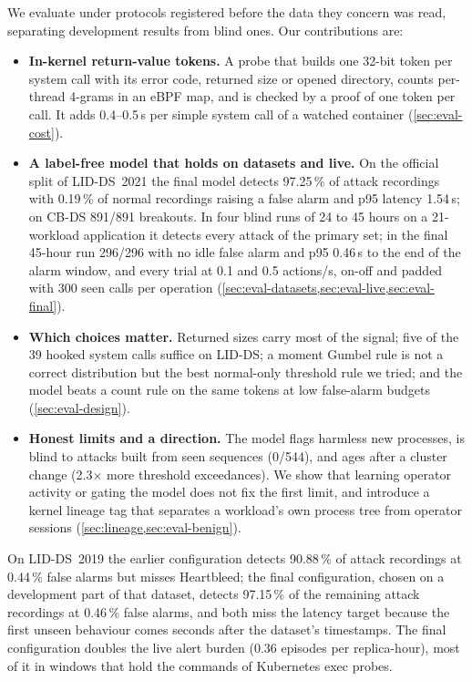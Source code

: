 We evaluate \sys under protocols registered before the data they concern was read, separating development results from
blind ones. Our contributions are:
\begin{itemize}
\item \textbf{In-kernel return-value tokens.} A probe that builds one 32-bit token per system call with its error code,
  returned size or opened directory, counts per-thread 4-grams in an eBPF map, and is checked by a proof of one token per
  call. It adds 0.4--0.5\,\textmu s per simple system call of a watched container (\cref{sec:eval-cost}).
\item \textbf{A label-free model that holds on datasets and live.} On the official split of LID-DS~2021 the final
  model detects 97.25\,\% of attack recordings with 0.19\,\% of normal recordings raising a false alarm and p95 latency
  1.54\,s; on CB-DS 891/891 breakouts. In four blind runs of 24 to 45 hours on a 21-workload application it detects every
  attack of the primary set; in the final 45-hour run 296/296 with no idle false alarm and p95 0.46\,s to the end of the
  alarm window, and every trial at 0.1 and 0.5 actions/s, on-off and padded with 300 seen calls per operation
  (\cref{sec:eval-datasets,sec:eval-live,sec:eval-final}).
\item \textbf{Which choices matter.} Returned sizes carry most of the signal; five of the 39 hooked system calls suffice
  on LID-DS; a moment Gumbel rule is not a correct distribution but the best normal-only threshold rule we tried; and
  the model beats a count rule on the same tokens at low false-alarm budgets (\cref{sec:eval-design}).
\item \textbf{Honest limits and a direction.} The model flags harmless new processes, is blind to attacks built from
  seen sequences (0/544), and ages after a cluster change (2.3$\times$ more threshold exceedances). We show that learning
  operator activity or gating the model does not fix the first limit, and introduce a kernel lineage tag that separates a
  workload's own process tree from operator sessions (\cref{sec:lineage,sec:eval-benign}).
\end{itemize}
On LID-DS~2019 the earlier configuration detects 90.88\,\% of attack recordings at 0.44\,\% false alarms but misses
Heartbleed; the final configuration, chosen on a development part of that dataset, detects 97.15\,\% of the remaining
attack recordings at 0.46\,\% false alarms, and both miss the latency target because the first unseen behaviour comes
seconds after the dataset's timestamps. The final configuration doubles the live alert burden (0.36 episodes per
replica-hour), most of it in windows that hold the commands of Kubernetes exec probes.
